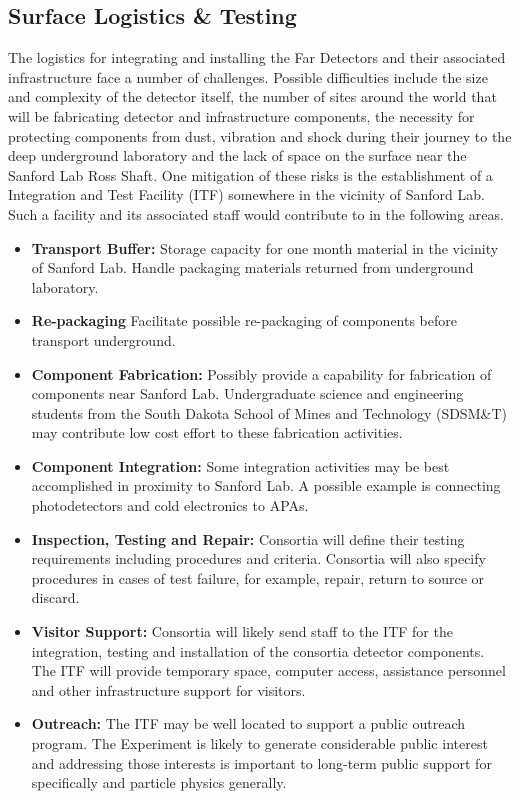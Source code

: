 \subsection{Surface Logistics \& Testing}
\label{sec:fdsp-coord-integ-test}

The logistics for integrating and installing the  Far
Detectors and their associated infrastructure face a number of
challenges. Possible difficulties include the size and complexity of
the detector itself, the number of sites around the world that will be
fabricating detector and infrastructure components, the necessity for
protecting components from dust, vibration and shock during their
journey to the deep underground laboratory and the lack of space on
the surface near the Sanford Lab Ross Shaft. One mitigation of these
risks is the establishment of a  Integration and Test
Facility (ITF) somewhere in the vicinity of Sanford Lab. Such a
facility and its associated staff would contribute to  in
the following areas.
\begin{itemize}
  \item {\bf Transport Buffer:} Storage capacity for one month
    material in the vicinity of Sanford Lab. Handle packaging
    materials returned from underground laboratory.
  \item {\bf Re-packaging} Facilitate possible re-packaging of
    components before transport underground.
  \item {\bf Component Fabrication:} Possibly provide a capability for
    fabrication of components near Sanford Lab. Undergraduate science
    and engineering students from the South Dakota School of Mines and
    Technology (SDSM\&T) may contribute low cost effort to these
    fabrication activities.
  \item {\bf Component Integration:} Some integration activities may
    be best accomplished in proximity to Sanford Lab. A possible
    example is connecting photodetectors and cold electronics to APAs.
  \item {\bf Inspection, Testing and Repair:} Consortia will define
    their testing requirements including procedures and
    criteria. Consortia will also specify procedures in cases of test
    failure, for example, repair, return to source or discard.
  \item {\bf Visitor Support:} Consortia will likely send staff to the
    ITF for the integration, testing and installation of the consortia
    detector components. The ITF will provide temporary space,
    computer access, assistance personnel and other infrastructure
    support for  visitors.
\item {\bf Outreach:} The ITF may be well located to support a public
  outreach program. The  Experiment is likely to generate
  considerable public interest and addressing those interests is
  important to long-term public support for  specifically
  and particle physics generally.
\end{itemize}

